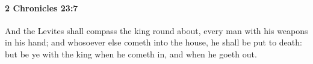 
		\paragraph{2 Chronicles 23:7} %
			\label{2CHRONICLES-23-7}

			And the Levites shall compass the king round about, every man with his weapons in his hand; and whosoever else cometh into the house, he shall be put to death: but be ye with the king when he cometh in, and when he goeth out.


